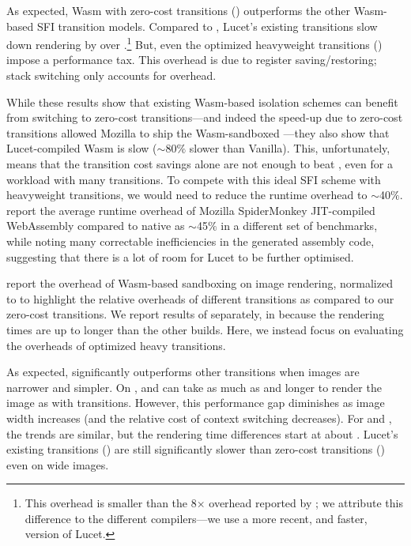 \noindent
As expected, Wasm with zero-cost transitions (\trfast) outperforms the
other Wasm-based SFI transition models.
%
Compared to \trfast, Lucet's existing transitions slow down rendering 
by over \ffMaxFontSlowdownWasmLucetZero.\footnote{
  This overhead is smaller than the 8$\times$ overhead reported by
  \citet{rlbox}; we attribute this difference to the different compilers\dash---we
  use a more recent, and faster, version of Lucet.
}
%
But, even the optimized heavyweight transitions (\trfullswitch) impose a
\ffMaxFontSlowdownWasmHeavyZero performance tax.
%
This overhead is due to register saving/restoring; stack switching
only accounts for \ffMaxFontStackSwitchWasmOverhead overhead.

While these results show that existing Wasm-based isolation schemes can benefit
from switching to zero-cost transitions\dash---and indeed the speed-up due to
zero-cost transitions allowed Mozilla to ship the Wasm-sandboxed
\libgraphite\dash---they also show that Lucet-compiled Wasm is slow
($\sim$80$\%$ slower than Vanilla).
%
This, unfortunately, means that the transition cost savings alone are not
enough to beat \tridealheavysixfour, even for a workload with many transitions.
%
To compete with this ideal SFI scheme with heavyweight transitions, we would
need to reduce the runtime overhead to $\sim$40$\%$.
%
\citet{not-so-fast} report the average runtime overhead of Mozilla SpiderMonkey JIT-compiled WebAssembly compared to native as $\sim$45$\%$ in a different set of benchmarks, while noting many correctable inefficiencies in the generated assembly code, suggesting that there is a lot of room for Lucet to be further optimised.

%
 report the overhead of Wasm-based sandboxing on
image rendering, normalized to \trfast to highlight the relative overheads
of different transitions as compared to our zero-cost transitions.
%
We report results of \trlucet separately, in  because the rendering times are up to
\ffMaxImgSlowdownWasmLucetZero longer than the other builds.
%
Here, we instead focus on evaluating the overheads of optimized
heavy transitions.

As expected, \trfast significantly outperforms other transitions when images 
are narrower and simpler.
%
On \simplejpeg, \trfullswitch and \trlucet can take as much as 
\ffMaxImgSimpleSlowdownWasmHeavyZero and \ffMaxImgSimpleSlowdownWasmLucetZero
longer to render the image as with \trfast transitions.
%
However, this performance gap diminishes as image width increases (and the
relative cost of context switching decreases).
%
For \stockjpeg and \randomjpeg, the \trfullswitch trends are similar, but
the rendering time differences start at about 
\ffMaxImgStockRandomSlowdownWasmHeavyZero.
%
Lucet's existing transitions (\trlucet) are still significantly slower 
than zero-cost transitions (\trfast) even on wide images.


